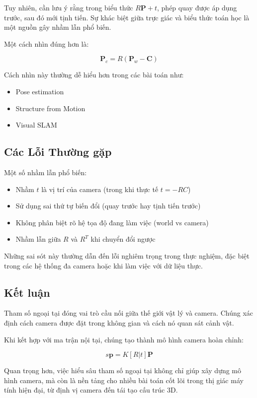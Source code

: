 Tuy nhiên, cần lưu ý rằng trong biểu thức $R\mathbf{P} + t$, phép quay được áp dụng trước, sau đó mới tịnh tiến. Sự khác biệt giữa trực giác và biểu thức toán học là một nguồn gây nhầm lẫn phổ biến.

Một cách nhìn đúng hơn là:

\[
\mathbf{P}_c = R(\mathbf{P}_w - \mathbf{C})
\]

Cách nhìn này thường dễ hiểu hơn trong các bài toán như:
\begin{itemize}
	\item Pose estimation
	\item Structure from Motion
	\item Visual SLAM
\end{itemize}

\subsection{Các Lỗi Thường gặp}
\label{subsec:extrinsic_common_mistakes}

Một số nhầm lẫn phổ biến:

\begin{itemize}
	\item Nhầm $t$ là vị trí của camera (trong khi thực tế $t = -RC$)
	\item Sử dụng sai thứ tự biến đổi (quay trước hay tịnh tiến trước)
	\item Không phân biệt rõ hệ tọa độ đang làm việc (world vs camera)
	\item Nhầm lẫn giữa $R$ và $R^T$ khi chuyển đổi ngược
\end{itemize}

Những sai sót này thường dẫn đến lỗi nghiêm trọng trong thực nghiệm, đặc biệt trong các hệ thống đa camera hoặc khi làm việc với dữ liệu thực.

\subsection*{Kết luận}
\label{subsec:extrinsic_conclusion}

Tham số ngoại tại đóng vai trò cầu nối giữa thế giới vật lý và camera. Chúng xác định cách camera được đặt trong không gian và cách nó quan sát cảnh vật.

Khi kết hợp với ma trận nội tại, chúng tạo thành mô hình camera hoàn chỉnh:

\[
s \mathbf{p} = K [R|t] \mathbf{P}
\]

Quan trọng hơn, việc hiểu sâu tham số ngoại tại không chỉ giúp xây dựng mô hình camera, mà còn là nền tảng cho nhiều bài toán cốt lõi trong thị giác máy tính hiện đại, từ định vị camera đến tái tạo cấu trúc 3D.

